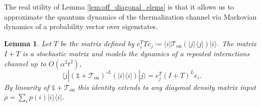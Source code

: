 \documentclass{article}
\newtheorem{lemma}[theorem]{Lemma}
\newcommand{\on}{\text{on}}
\newcommand{\ket}[1]{|#1\rangle}
\newcommand{\bra}[1]{\langle #1|}
\newcommand{\ketbra}[2]{| #1\rangle\! \langle #2|}
\newcommand{\bigo}[1]{O\left( #1 \right)}
\newcommand{\identity}{\mathds{1}}
\begin{document}
The real utility of Lemma \ref{lem:off_diagonal_elems} is that it allows us to approximate the quantum dynamics of the thermalization channel via Markovian dynamics of a probability vector over eigenstates.
\begin{lemma} \label{lem:quantum_to_classical}
    Let $T$ be the matrix defined by $e_i^T T e_j \coloneqq \bra{i} \mathcal{T}_{\on}(\ketbra{j}{j}) \ket{i}$. The matrix $I + T$ is a stochastic matrix and models the dynamics of a repeated interactions channel up to $\bigo{\alpha^2 t^2}$,
    \begin{equation}
        \bra{j} (\identity + \mathcal{T}_{\on})^{\circ L} (\ketbra{i}{i}) \ket{j} = e_j^T (I + T)^L e_i.
    \end{equation}
    By linearity of $\identity + \mathcal{T}_{\on}$ this identity extends to any diagonal density matrix input $\rho = \sum_i p(i) \ketbra{i}{i}$.
\end{lemma}
\end{document}
